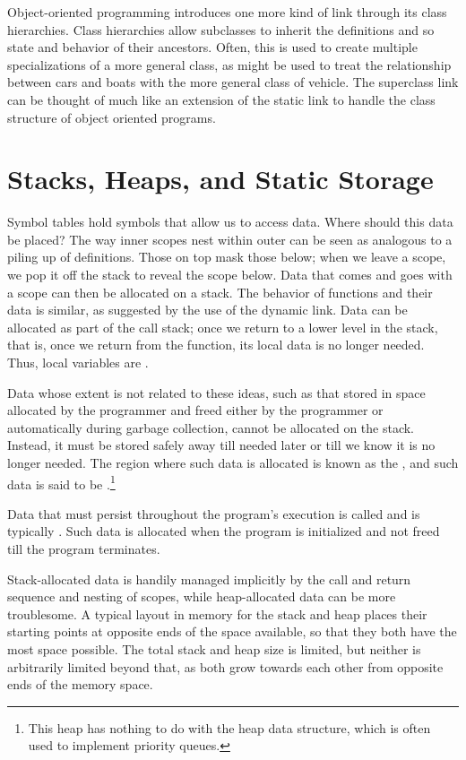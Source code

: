 Object-oriented programming introduces one more kind of link through its class hierarchies. Class hierarchies allow subclasses to inherit the definitions and so state and behavior of their ancestors. Often, this is used to create multiple specializations of a more general class, as might be used to treat the relationship between cars and boats with the more general class of vehicle. The superclass link can be thought of much like an extension of the static link to handle the class structure of object oriented programs.

\section{Stacks, Heaps, and Static Storage}
Symbol tables hold symbols that allow us to access data. Where should this data be placed? The way inner scopes nest within outer can be seen as analogous to a piling up of definitions. Those on top mask those below; when we leave a scope, we pop it off the stack to reveal the scope below. Data that comes and goes with a scope can then be allocated on a stack. The behavior of functions and their data is similar, as suggested by the use of the dynamic link. Data can be allocated as part of the call stack; once we return to a lower level in the stack, that is, once we return from the function, its local data is no longer needed. Thus, local variables are .

Data whose extent is not related to these ideas, such as that stored in space allocated by the programmer and freed either by the programmer or automatically during garbage collection, cannot be allocated on the stack. Instead, it must be stored safely away till needed later or till we know it is no longer needed. The region where such data is allocated is known as the , and such data is said to be .\footnote{This heap has nothing to do with the heap data structure, which is often used to implement priority queues.}

Data that must persist throughout the program's execution is called  and is typically . Such data is allocated when the program is initialized and not freed till the program terminates.

Stack-allocated data is handily managed implicitly by the call and return sequence and nesting of scopes, while heap-allocated data can be more troublesome. A typical layout in memory for the stack and heap places their starting points at opposite ends of the space available, so that they both have the most space possible. The total stack and heap size is limited, but neither is arbitrarily limited beyond that, as both grow towards each other from opposite ends of the memory space.

